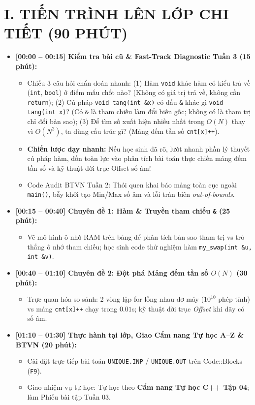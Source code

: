 \documentclass[11pt,a4paper]{article}
\begin{document}
\section*{\color{AsianDarkBlue}I. TIẾN TRÌNH LÊN LỚP CHI TIẾT (90 PHÚT)}
\begin{itemize}
    \setlength{\itemsep}{2pt}
    \item \textbf{[00:00 -- 00:15] Kiểm tra bài cũ \& Fast-Track Diagnostic Tuần 3 (15 phút):}
    \begin{itemize}
        \item Chiếu 3 câu hỏi chẩn đoán nhanh: (1) Hàm \texttt{void} khác hàm có kiểu trả về (\texttt{int}, \texttt{bool}) ở điểm mấu chốt nào? (Không có giá trị trả về, không cần \texttt{return}); (2) Cú pháp \texttt{void tang(int \&x)} có dấu \texttt{\&} khác gì \texttt{void tang(int x)}? (Có \texttt{\&} là tham chiếu làm đổi biến gốc; không có là tham trị chỉ đổi bản sao); (3) Để tìm số xuất hiện nhiều nhất trong $O(N)$ thay vì $O(N^2)$, ta dùng cấu trúc gì? (Mảng đếm tần số \texttt{cnt[x]++}).
        \item \textbf{Chiến lược dạy nhanh:} Nếu học sinh đã rõ, lướt nhanh phần lý thuyết cú pháp hàm, dồn toàn lực vào phân tích bài toán thực chiến mảng đếm tần số và kỹ thuật dời trục Offset số âm!
        \item Code Audit BTVN Tuần 2: Thói quen khai báo mảng toàn cục ngoài \texttt{main()}, bẫy khởi tạo Min/Max số âm và lỗi tràn biên \textit{out-of-bounds}.
    \end{itemize}
    \item \textbf{[00:15 -- 00:40] Chuyên đề 1: Hàm \& Truyền tham chiếu \texttt{\&} (25 phút):}
    \begin{itemize}
        \item Vẽ mô hình ô nhớ RAM trên bảng để phân tích bản sao tham trị vs trỏ thẳng ô nhớ tham chiếu; học sinh code thử nghiệm hàm \texttt{my\_swap(int \&u, int \&v)}.
    \end{itemize}
    \item \textbf{[00:40 -- 01:10] Chuyên đề 2: Đột phá Mảng đếm tần số $O(N)$ (30 phút):}
    \begin{itemize}
        \item Trực quan hóa so sánh: 2 vòng lặp for lồng nhau đơ máy ($10^{10}$ phép tính) vs mảng \texttt{cnt[x]++} chạy trong $0.01$s; kỹ thuật dời trục \textit{Offset} khi dãy có số âm.
    \end{itemize}
    \item \textbf{[01:10 -- 01:30] Thực hành tại lớp, Giao Cẩm nang Tự học A--Z \& BTVN (20 phút):}
    \begin{itemize}
        \item Cài đặt trực tiếp bài toán \texttt{UNIQUE.INP} / \texttt{UNIQUE.OUT} trên Code::Blocks (\texttt{F9}).
        \item Giao nhiệm vụ tự học: Tự học theo \textbf{Cẩm nang Tự học C++ Tập 04}; làm Phiếu bài tập Tuần 03.
    \end{itemize}
\end{itemize}
\end{document}
